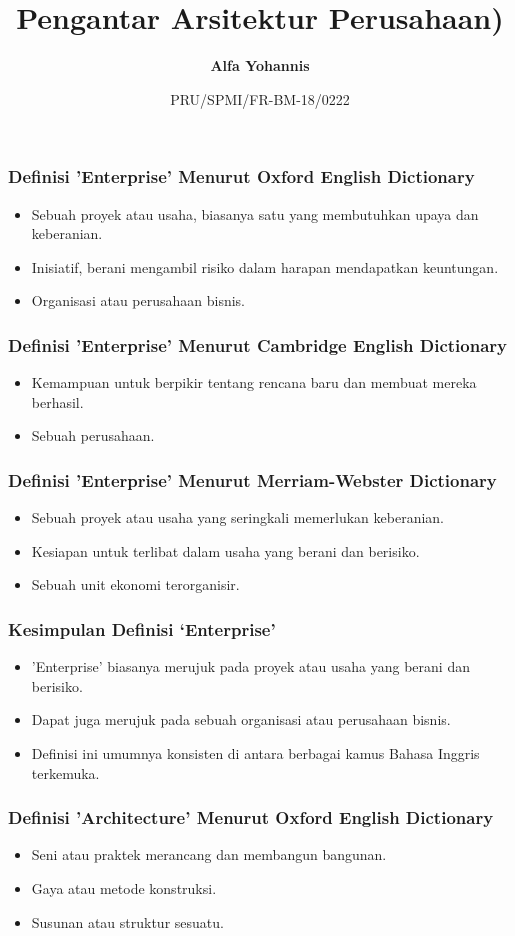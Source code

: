 \documentclass[aspectratio=169, table]{beamer}
\title{\Large Pengantar Arsitektur Perusahaan)}
\date[Serial]{\scriptsize {PRU/SPMI/FR-BM-18/0222}}
\author[Pradita]{\small {\textbf{Alfa Yohannis}}}
\begin{document}
	
	\frame{\titlepage}
	
	\begin{frame}
		\frametitle{Definisi 'Enterprise' Menurut Oxford English Dictionary}
		\begin{itemize}
			\item Sebuah proyek atau usaha, biasanya satu yang membutuhkan upaya dan keberanian.
			\item Inisiatif, berani mengambil risiko dalam harapan mendapatkan keuntungan.
			\item Organisasi atau perusahaan bisnis.
		\end{itemize}
	\end{frame}
	
	\begin{frame}
		\frametitle{Definisi 'Enterprise' Menurut Cambridge English Dictionary}
		\begin{itemize}
			\item Kemampuan untuk berpikir tentang rencana baru dan membuat mereka berhasil.
			\item Sebuah perusahaan.
		\end{itemize}
	\end{frame}
	
	\begin{frame}
		\frametitle{Definisi 'Enterprise' Menurut Merriam-Webster Dictionary}
		\begin{itemize}
			\item Sebuah proyek atau usaha yang seringkali memerlukan keberanian.
			\item Kesiapan untuk terlibat dalam usaha yang berani dan berisiko.
			\item Sebuah unit ekonomi terorganisir.
		\end{itemize}
	\end{frame}
	
	\begin{frame}
		\frametitle{Kesimpulan Definisi `Enterprise'}
		\begin{itemize}
			\item 'Enterprise' biasanya merujuk pada proyek atau usaha yang berani dan berisiko.
			\item Dapat juga merujuk pada sebuah organisasi atau perusahaan bisnis.
			\item Definisi ini umumnya konsisten di antara berbagai kamus Bahasa Inggris terkemuka.
		\end{itemize}
	\end{frame}
	
	\begin{frame}
		\frametitle{Definisi 'Architecture' Menurut Oxford English Dictionary}
		\begin{itemize}
			\item Seni atau praktek merancang dan membangun bangunan.
			\item Gaya atau metode konstruksi.
			\item Susunan atau struktur sesuatu.
		\end{itemize}
	\end{frame}
	
\end{document}
